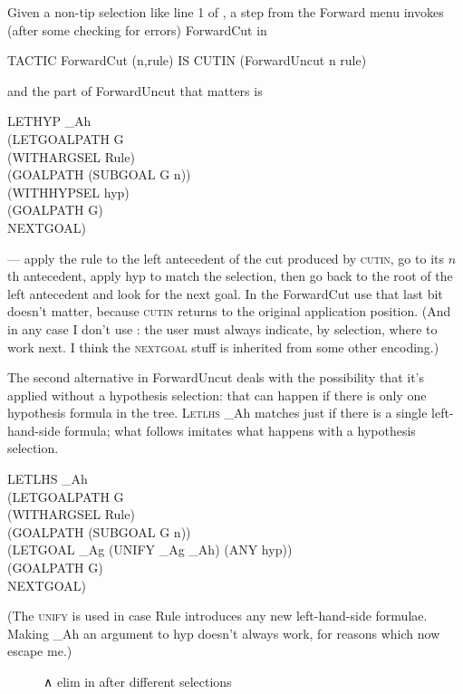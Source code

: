 Given a non-tip selection like line 1 of , a step from the Forward menu invokes (after some checking for errors) ForwardCut in 
\begin{japeish}
TACTIC ForwardCut (n,rule) IS CUTIN (ForwardUncut n rule)
\end{japeish}
and the part of ForwardUncut that matters is
\begin{japeish}
LETHYP \_Ah \\
\tab (LETGOALPATH G \\
\tab \tab (WITHARGSEL Rule) \\
\tab \tab (GOALPATH (SUBGOAL G n)) \\
\tab \tab (WITHHYPSEL hyp) \\
\tab \tab (GOALPATH G) \\
\tab \tab NEXTGOAL)
\end{japeish}
--- apply the rule to the left antecedent of the cut produced by \textsc{cutin}, go to its $n$th antecedent, apply hyp to match the selection, then go back to the root of the left antecedent and look for the next goal. In the ForwardCut use that last bit doesn't matter, because \textsc{cutin} returns to the original application position. (And in any case I don't use : the user must always indicate, by selection, where to work next. I think the \textsc{nextgoal} stuff is inherited from some other encoding.)

The second alternative in ForwardUncut deals with the possibility that it's applied without a hypothesis selection: that can happen if there is only one hypothesis formula in the tree. \textsc{Letlhs} \_Ah matches just if there is a single left-hand-side formula; what follows imitates what happens with a hypothesis selection.
\begin{japeish}
LETLHS \_Ah \\
\tab (LETGOALPATH G \\
\tab \tab (WITHARGSEL Rule)\\
\tab \tab (GOALPATH (SUBGOAL G n))\\
\tab \tab (LETGOAL \_Ag (UNIFY \_Ag \_Ah) (ANY hyp))\\
\tab \tab (GOALPATH G) \\
\tab \tab NEXTGOAL)
\end{japeish}
(The \textsc{unify} is used in case Rule introduces any new left-hand-side formulae. Making \_Ah an argument to hyp doesn't always work, for reasons which now escape me.)

\begin{figure}
\centering
{}
\caption{∧ elim in  after different selections}
\label{fig:I2L:andcutinbox3}
\end{figure} 

